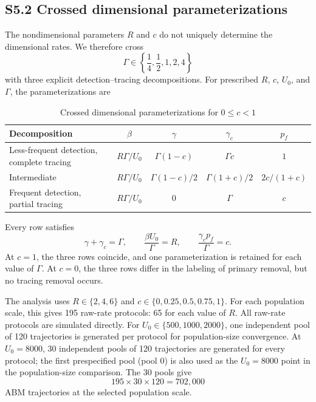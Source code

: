 \documentclass[11pt]{article}
\begin{document}
\subsection*{S5.2 Crossed dimensional parameterizations}
The nondimensional parameters $R$ and $c$ do not uniquely determine the dimensional rates. We therefore cross
\[
\Gamma\in\left\{\frac14,\frac12,1,2,4\right\}
\]
with three explicit detection--tracing decompositions. For prescribed $R$, $c$, $U_0$, and $\Gamma$, the parameterizations are
\begin{table}[H]
\caption{Crossed dimensional parameterizations for $0\leq c<1$}
\centering\small
\begin{tabularx}{\textwidth}{@{}p{}cccc@{}}
\toprule
Decomposition & $\beta$ & $\gamma$ & $\gamma_c$ & $p_f$ \\
\midrule
Less-frequent detection, complete tracing & $R\Gamma/U_0$ & $\Gamma(1-c)$ & $\Gamma c$ & $1$ \\
Intermediate & $R\Gamma/U_0$ & $\Gamma(1-c)/2$ & $\Gamma(1+c)/2$ & $2c/(1+c)$ \\
Frequent detection, partial tracing & $R\Gamma/U_0$ & $0$ & $\Gamma$ & $c$ \\
\bottomrule
\end{tabularx}
\end{table}
Every row satisfies
\[
\gamma+\gamma_c=\Gamma,\qquad
\frac{\beta U_0}{\Gamma}=R,\qquad
\frac{\gamma_c p_f}{\Gamma}=c.
\]
At $c=1$, the three rows coincide, and one parameterization is retained for each value of $\Gamma$. At $c=0$, the three rows differ in the labeling of primary removal, but no tracing removal occurs.

The analysis uses $R\in\{2,4,6\}$ and $c\in\{0,0.25,0.5,0.75,1\}$. For each population scale, this gives 195 raw-rate protocols: 65 for each value of $R$. All raw-rate protocols are simulated directly. For $U_0\in\{500,1000,2000\}$, one independent pool of 120 trajectories is generated per protocol for population-size convergence. At $U_0=8000$, 30 independent pools of 120 trajectories are generated for every protocol; the first prespecified pool (pool 0) is also used as the $U_0=8000$ point in the population-size comparison. The 30 pools give
\[
195\times30\times120=702{,}000
\]
ABM trajectories at the selected population scale.
\end{document}
